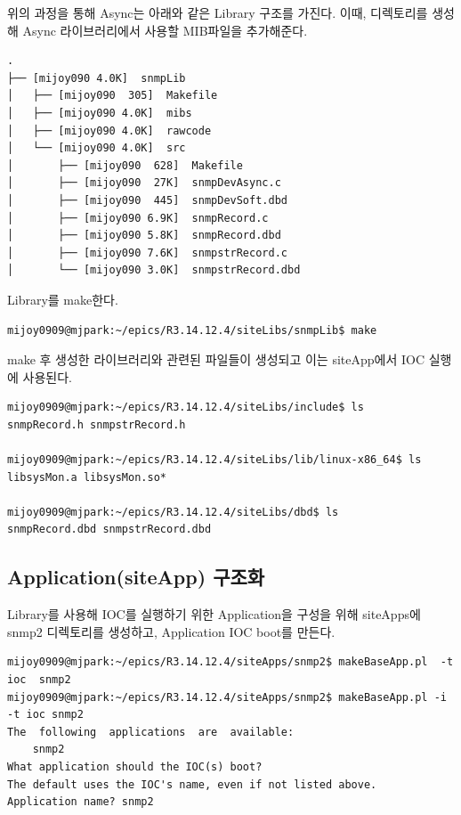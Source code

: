 \documentclass[11pt
  , a4paper
  , article
  , oneside
]{memoir}
\begin{document}
위의 과정을 통해 Async는 아래와 같은 Library 구조를 가진다. 이때, 디렉토리를 생성해 Async 라이브러리에서 사용할 MIB파일을 추가해준다.

{\scriptsize
\begin{verbatim}
.
├── [mijoy090 4.0K]  snmpLib
│   ├── [mijoy090  305]  Makefile
│   ├── [mijoy090 4.0K]  mibs
│   ├── [mijoy090 4.0K]  rawcode
│   └── [mijoy090 4.0K]  src
│       ├── [mijoy090  628]  Makefile
│       ├── [mijoy090  27K]  snmpDevAsync.c
│       ├── [mijoy090  445]  snmpDevSoft.dbd
│       ├── [mijoy090 6.9K]  snmpRecord.c
│       ├── [mijoy090 5.8K]  snmpRecord.dbd
│       ├── [mijoy090 7.6K]  snmpstrRecord.c
│       └── [mijoy090 3.0K]  snmpstrRecord.dbd
\end{verbatim}
}

\hfill

Library를 make한다. 

{\scriptsize
\begin{lstlisting}[style=termstyle]
mijoy0909@mjpark:~/epics/R3.14.12.4/siteLibs/snmpLib$ make
\end{lstlisting}
}

\hfill

make 후 생성한 라이브러리와 관련된 파일들이 생성되고 이는 siteApp에서 IOC 실행에 사용된다.

{\scriptsize
\begin{lstlisting}[style=termstyle]
mijoy0909@mjpark:~/epics/R3.14.12.4/siteLibs/include$ ls
snmpRecord.h snmpstrRecord.h

mijoy0909@mjpark:~/epics/R3.14.12.4/siteLibs/lib/linux-x86_64$ ls
libsysMon.a libsysMon.so*

mijoy0909@mjpark:~/epics/R3.14.12.4/siteLibs/dbd$ ls
snmpRecord.dbd snmpstrRecord.dbd
\end{lstlisting}
}


\subsection{Application(siteApp) 구조화}

Library를 사용해 IOC를 실행하기 위한 Application을 구성을 위해 siteApps에 snmp2 디렉토리를 생성하고, Application IOC boot를 만든다.


{\scriptsize
\begin{lstlisting}[style=termstyle]
mijoy0909@mjpark:~/epics/R3.14.12.4/siteApps/snmp2$ makeBaseApp.pl  -t  ioc  snmp2
mijoy0909@mjpark:~/epics/R3.14.12.4/siteApps/snmp2$ makeBaseApp.pl -i -t ioc snmp2 
The  following  applications  are  available:  
    snmp2 
What application should the IOC(s) boot?
The default uses the IOC's name, even if not listed above. 
Application name? snmp2 
\end{lstlisting}
}
\end{document}
